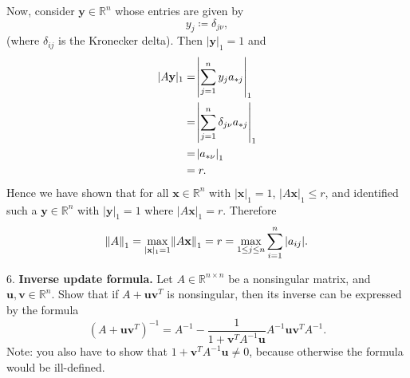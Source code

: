 \documentclass{article}
\def\*#1{\mathbf{#1}}
\newcommand{\R}{\mathbb{R}}
\begin{document}
Now, consider $\*y \in \R^n$ whose entries are given by
%
\begin{equation*}
    y_j \coloneqq \delta_{j \nu}
    ,
\end{equation*}
%
(where $\delta_{i j}$ is the Kronecker delta).
%
Then $|\*y|_1 = 1$ and
%
\begin{align*}
    |A \*y|_1
        &= \envert{\sum_{j = 1}^n y_j a_{*j}}_1 \\
        &= \envert{\sum_{j = 1}^n \delta_{j \nu} a_{*j}}_1 \\
        &= \envert{a_{* \nu}}_1 \\
        &= r
        .
\end{align*}
%
Hence we have shown that for all $\*x \in \R^n$ with $|\*x|_1 = 1$, $|A\*x|_1 \leq r$,
and identified such a $\*y \in \R^n$ with $|\*y|_1 = 1$ where $|A\*x|_1 = r$.
Therefore
%
\begin{equation*}
    \enVert{A}_1
        = \max_{|\*x|_1 = 1} \enVert{A \*x}_1
        = r
        = \max_{1 \leq j \leq n} \sum_{i = 1}^n |a_{ij}|
    .
\end{equation*}

\newpage

6. \textbf{Inverse update formula.}
Let $A \in \R^{n \times n}$ be a nonsingular matrix, and $\*u, \*v \in \R^n$.
Show that if $A + \*u \*v^T$ is nonsingular, then its inverse can be expressed
by the formula
%
\begin{equation*}
    (A + \*u \*v^T)^{-1} = A^{-1} - \frac{1}{1 + \*v^T A^{-1} \*u} A^{-1} \*u \*v^T A^{-1}.
\end{equation*}
%
Note: you also have to show that $1 + \*v^T A^{-1} \*u \neq 0$, because otherwise the formula
would be ill-defined.
\end{document}
